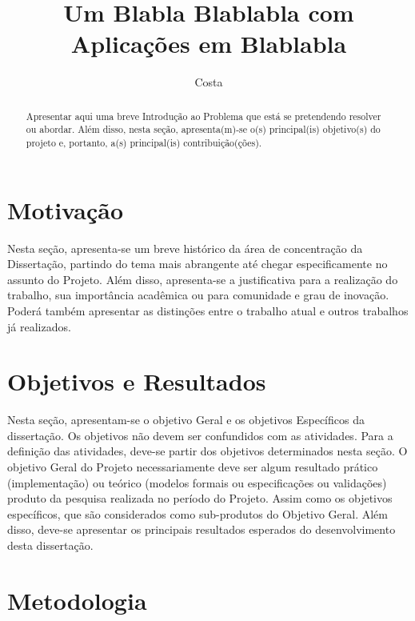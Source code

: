 \documentclass[diss-proposta,nocipinfo]{texufpel}
\title{Um Blabla Blablabla com Aplicações em Blablabla}
\author{Costa}{Alexandre Gomes da}
\begin{document}

\maketitle 
\sloppy

\begin{abstract}
  Apresentar aqui uma breve Introdução ao Problema que está se
  pretendendo resolver ou abordar. Além disso, nesta seção,
  apresenta(m)-se o(s) principal(is) objetivo(s) do projeto e,
  portanto, a(s) principal(is) contribuição(ções).
\end{abstract}

\chapter{Motivação}

Nesta seção, apresenta-se um breve histórico da área de concentração
da Dissertação, partindo do tema mais abrangente até chegar
especificamente no assunto do Projeto. Além disso, apresenta-se a
justificativa para a realização do trabalho, sua importância acadêmica
ou para comunidade e grau de inovação. Poderá também apresentar as
distinções entre o trabalho atual e outros trabalhos já realizados.

\chapter{Objetivos e Resultados}

Nesta seção, apresentam-se o objetivo Geral e os objetivos Específicos
da dissertação. Os objetivos não devem ser confundidos com as
atividades. Para a definição das atividades, deve-se partir dos
objetivos determinados nesta seção. O objetivo Geral do Projeto
necessariamente deve ser algum resultado prático (implementação) ou
teórico (modelos formais ou especificações ou validações) produto da
pesquisa realizada no período do Projeto. Assim como os objetivos
específicos, que são considerados como sub-produtos do Objetivo
Geral. Além disso, deve-se apresentar os principais resultados
esperados do desenvolvimento desta dissertação.

\chapter{Metodologia}
\end{document}
